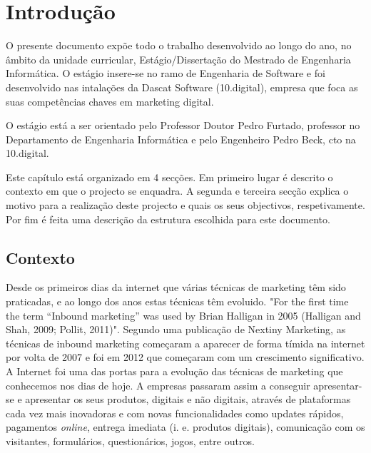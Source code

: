 \chapter{Introdução}
\label{sec:introducao}

O presente documento expõe todo o trabalho desenvolvido ao longo do ano, no âmbito da unidade curricular, Estágio/Dissertação do Mestrado de Engenharia Informática. O estágio insere-se no ramo de Engenharia de Software e foi desenvolvido nas intalações da Dascat Software (10.digital)\cite{10}, empresa que foca as suas competências chaves em marketing digital. 

O estágio está a ser orientado pelo Professor Doutor Pedro Furtado, professor no Departamento de Engenharia Informática e pelo Engenheiro Pedro Beck, \acrshort{cto} na 10.digital.

Este capítulo está organizado em 4 secções. Em primeiro lugar é descrito o contexto em que o projecto se enquadra. A segunda e terceira secção explica o motivo para a realização deste projecto e quais os seus objectivos, respetivamente. Por fim é feita uma descrição da estrutura escolhida para este documento.

\section{Contexto}
\label{subsec:contexto}

Desde os primeiros dias da internet que várias técnicas de marketing têm sido praticadas, e ao longo dos anos estas técnicas têm evoluido. "For the first time the term “Inbound marketing” was used by Brian Halligan in 2005 (Halligan and Shah, 2009; Pollit, 2011)"\cite{bookinbound}\cite{inbound_paper}. Segundo uma publicação de Nextiny Marketing\cite{postNextiny}, as técnicas de inbound marketing começaram a aparecer de forma tímida na internet por volta de 2007 e foi em 2012 que começaram com um crescimento significativo. A Internet foi uma das portas para a evolução das técnicas de marketing que conhecemos nos dias de hoje. A empresas passaram assim a conseguir apresentar-se e apresentar os seus produtos, digitais e não digitais, através de plataformas cada vez mais inovadoras e com novas funcionalidades como updates rápidos, pagamentos \textit{online}, entrega imediata (i. e. produtos digitais), comunicação com os visitantes, formulários, questionários, jogos, entre outros.  

